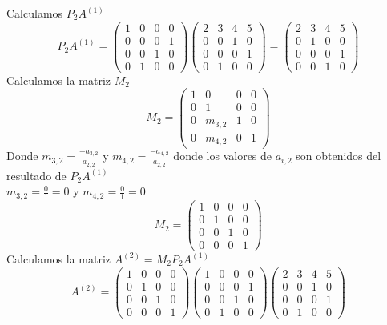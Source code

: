 Calculamos $P_{2}A^{(1)} $
\[ P_{2}A^{(1)} =
     \left( \begin{array}{cccc}
    1 & 0 & 0 & 0\\
    0 & 0 & 0 & 1\\ 
    0 & 0 & 1 & 0\\ 
    0 & 1 & 0 & 0
    \end{array} \right)\left( \begin{array}{cccc}
    2 & 3 & 4 & 5\\
    0 & 0 & 1 & 0\\ 
    0 & 0 & 0 & 1\\ 
    0 & 1 & 0 & 0
    \end{array} \right) =
    \left( \begin{array}{cccc}
    2 & 3 & 4 & 5\\
    0 & 1 & 0 & 0\\
    0 & 0 & 0 & 1\\ 
    0 & 0 & 1 & 0
    \end{array} \right) 
\]
Calculamos la matriz $M_2$
\[ M_2 =
    \left( \begin{array}{cccc}
    1 & 0 & 0 & 0\\
    0 & 1 & 0 & 0\\ 
    0 & m_{3,2} & 1 & 0\\ 
    0 & m_{4,2} & 0 & 1
    \end{array} \right) 
\]
Donde $m_{3,2} = \frac{-a_{3,2}}{a_{2,2}}$ y $m_{4,2} = \frac{-a_{4,2}}{a_{2,2}}$ donde los valores de $a_{i,2}$ son obtenidos del resultado de $P_{2}A^{(1)} $ \\
$m_{3,2} = \frac{0}{1} = 0$ y $m_{4,2} = \frac{0}{1} = 0$
\[ M_2 =
    \left( \begin{array}{cccc}
    1 & 0 & 0 & 0\\
    0 & 1 & 0 & 0\\ 
    0 & 0 & 1 & 0\\ 
    0 & 0 & 0 & 1
    \end{array} \right) 
\]
Calculamos la matriz $A^{(2)} = M_{2}P_{2}A^{(1)}$
\[ A^{(2)} =
    \left( \begin{array}{cccc}
    1 & 0 & 0 & 0\\
    0 & 1 & 0 & 0\\ 
    0 & 0 & 1 & 0\\ 
    0 & 0 & 0 & 1
    \end{array} \right) 
    \left( \begin{array}{cccc}
    1 & 0 & 0 & 0\\
    0 & 0 & 0 & 1\\ 
    0 & 0 & 1 & 0\\ 
    0 & 1 & 0 & 0
    \end{array} \right)
    \left( \begin{array}{cccc}
    2 & 3 & 4 & 5\\
    0 & 0 & 1 & 0\\ 
    0 & 0 & 0 & 1\\ 
    0 & 1 & 0 & 0
    \end{array} \right)
\]
